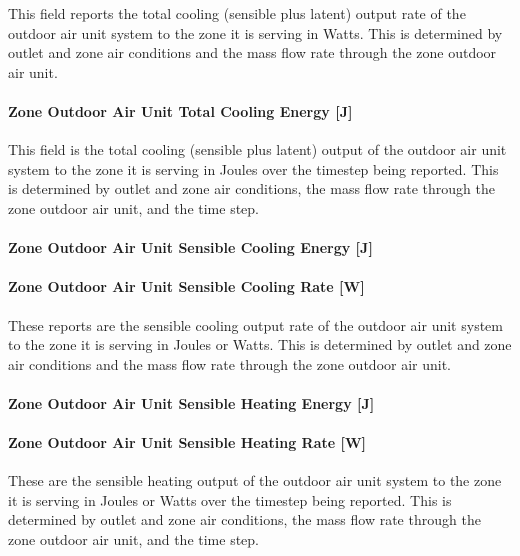This field reports the total cooling (sensible plus latent) output rate of the outdoor air unit system to the zone it is serving in Watts. This is determined by outlet and zone air conditions and the mass flow rate through the zone outdoor air unit.

\paragraph{Zone Outdoor Air Unit Total Cooling Energy {[}J{]}}\label{zone-outdoor-air-unit-total-cooling-energy-j}

This field is the total cooling (sensible plus latent) output of the outdoor air unit system to the zone it is serving in Joules over the timestep being reported. This is determined by outlet and zone air conditions, the mass flow rate through the zone outdoor air unit, and the time step.

\paragraph{Zone Outdoor Air Unit Sensible Cooling Energy {[}J{]}}\label{zone-outdoor-air-unit-sensible-cooling-energy-j}

\paragraph{Zone Outdoor Air Unit Sensible Cooling Rate {[}W{]}}\label{zone-outdoor-air-unit-sensible-cooling-rate-w}

These reports are the sensible cooling output rate of the outdoor air unit system to the zone it is serving in Joules or Watts. This is determined by outlet and zone air conditions and the mass flow rate through the zone outdoor air unit.

\paragraph{Zone Outdoor Air Unit Sensible Heating Energy {[}J{]}}\label{zone-outdoor-air-unit-sensible-heating-energy-j}

\paragraph{Zone Outdoor Air Unit Sensible Heating Rate {[}W{]}}\label{zone-outdoor-air-unit-sensible-heating-rate-w}

These are the sensible heating output of the outdoor air unit system to the zone it is serving in Joules or Watts over the timestep being reported. This is determined by outlet and zone air conditions, the mass flow rate through the zone outdoor air unit, and the time step.

